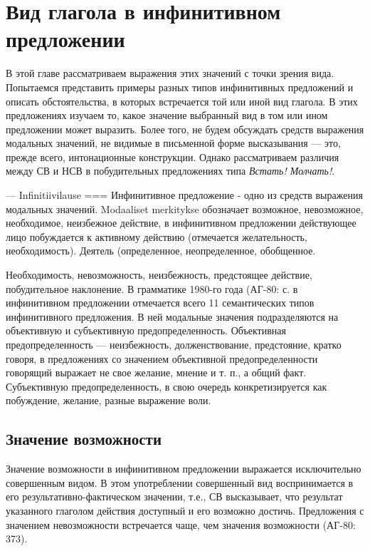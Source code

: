 \section{Вид глагола в инфинитивном предложении}

В этой главе рассматриваем выражения этих значений с точки зрения вида. Попытаемся представить примеры разных типов инфинитивных предложений и описать обстоятельства, в которых встречается той или иной вид глагола. В этих предложениях изучаем то, какое значение выбранный вид в том или ином предложении может выразить. Более того, не будем обсуждать средств выражения модальных значений, не видимые в письменной форме высказывания --- это, прежде всего, интонационные конструкции. Однако рассматриваем различия между СВ и НСВ в побудительных предложениях типа \textit{Встать! Молчать!}.

--- Infinitiivilause === Инфинитивное предложение - одно из средств выражения модальных значений.  Modaaliset merkitykse обозначает возможное, невозможное, необходимое, неизбежное действие, в инфинитивном предложении действующее лицо побуждается к активному действию (отмечается желательность, необходимость). Деятель (определенное, неопределенное, обобщенное.

Необходимость, невозможность, неизбежность, предстоящее действие, побудительное наклонение. В грамматике 1980-го года (АГ-80: с. в инфинитивном предложении отмечается всего 11 семантических типов инфинитивного предложения. В ней модальные значения подразделяются на объективную и субъективную предопределенность. Объективная предопределенность --- неизбежность, долженствование, предстояние, кратко говоря, в предложениях со значением объективной предопределенности говорящий выражает не свое желание, мнение и т. п., а общий факт. Субъективную предопределенность, в свою очередь конкретизируется как побуждение, желание, разные выражение воли.


\subsection{Значение возможности}

Значение возможности в инфинитивном предложении выражается исключительно совершенным видом. В этом употреблении совершенный вид воспринимается в его результативно-фактическом значении, т.е., СВ высказывает, что результат указанного глаголом действия доступный и его возможно достичь. Предложения с значением невозможности встречается чаще, чем значения возможности (АГ-80: 373). 

